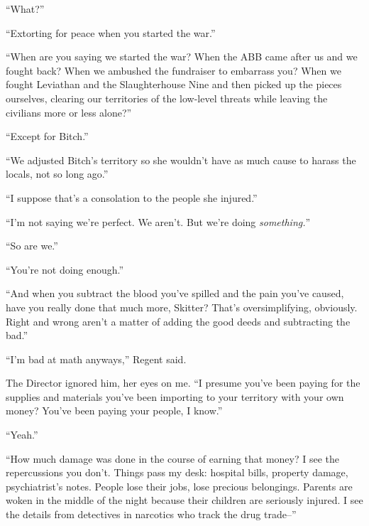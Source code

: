 ``What?''



``Extorting for peace when you started the war.''



``When are you saying we started the war?  When the ABB came after us and we fought back?  When we ambushed the fundraiser to embarrass you?  When we fought Leviathan and the Slaughterhouse Nine and then picked up the pieces ourselves, clearing our territories of the low-level threats while leaving the civilians more or less alone?''



``Except for Bitch.''



``We adjusted Bitch's territory so she wouldn't have as much cause to harass the locals, not so long ago.''



``I suppose that's a consolation to the people she injured.''



``I'm not saying we're perfect.  We aren't.  But we're doing \emph{something.}''



``So are we.''



``You're not doing enough.''



``And when you subtract the blood you've spilled and the pain you've caused, have you really done that much more, Skitter?  That's oversimplifying, obviously.  Right and wrong aren't a matter of adding the good deeds and subtracting the bad.''



``I'm bad at math anyways,'' Regent said.



The Director ignored him, her eyes on me.  ``I presume you've been paying for the supplies and materials you've been importing to your territory with your own money?  You've been paying your people, I know.''



``Yeah.''



``How much damage was done in the course of earning that money?  I see the repercussions you don't.  Things pass my desk: hospital bills, property damage, psychiatrist's notes.  People lose their jobs, lose precious belongings.  Parents are woken in the middle of the night because their children are seriously injured.   I see the details from detectives in narcotics who track the drug trade--''



